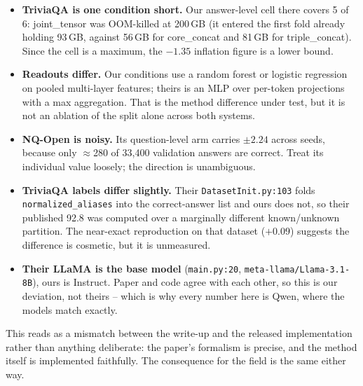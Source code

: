 \documentclass[11pt,a4paper]{article}
\begin{document}
\begin{itemize}
\item \textbf{TriviaQA is one condition short.} Our answer-level cell there covers 5 of 6:
joint\_tensor was OOM-killed at 200\,GB (it entered the first fold already holding 93\,GB, against
56\,GB for core\_concat and 81\,GB for triple\_concat). Since the cell is a maximum, the $-1.35$
inflation figure is a lower bound.
\item \textbf{Readouts differ.} Our conditions use a random forest or logistic regression on pooled
multi-layer features; theirs is an MLP over per-token projections with a max aggregation. That is
the method difference under test, but it is not an ablation of the split alone across both systems.
\item \textbf{NQ-Open is noisy.} Its question-level arm carries $\pm2.24$ across seeds, because only
$\approx$280 of 33{,}400 validation answers are correct. Treat its individual value loosely; the
direction is unambiguous.
\item \textbf{TriviaQA labels differ slightly.} Their \texttt{DatasetInit.py:103} folds
\texttt{normalized\_aliases} into the correct-answer list and ours does not, so their published 92.8
was computed over a marginally different known/unknown partition. The near-exact reproduction on that
dataset ($+0.09$) suggests the difference is cosmetic, but it is unmeasured.
\item \textbf{Their LLaMA is the base model} (\texttt{main.py:20}, \texttt{meta-llama/Llama-3.1-8B}),
ours is Instruct. Paper and code agree with each other, so this is our deviation, not theirs -- which
is why every number here is Qwen, where the models match exactly.
\end{itemize}

\medskip
\noindent This reads as a mismatch between the write-up and the released implementation rather than
anything deliberate: the paper's formalism is precise, and the method itself is implemented
faithfully. The consequence for the field is the same either way.
\end{document}
